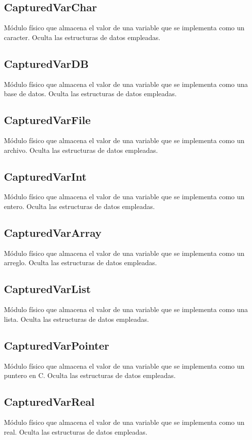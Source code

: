 \documentclass[a4paper,10pt]{report}
\begin{document}
			\subsection{CapturedVarChar}
			Módulo físico que almacena el valor de una variable que se implementa como un caracter. Oculta las estructuras de datos empleadas.
			\subsection{CapturedVarDB}
			Módulo físico que almacena el valor de una variable que se implementa como una base de datos. Oculta las estructuras de datos empleadas.
			\subsection{CapturedVarFile}
			Módulo físico que almacena el valor de una variable que se implementa como un archivo. Oculta las estructuras de datos empleadas.
			\subsection{CapturedVarInt}
			Módulo físico que almacena el valor de una variable que se implementa como un entero. Oculta las estructuras de datos empleadas.
			\subsection{CapturedVarArray}
			Módulo físico que almacena el valor de una variable que se implementa como un arreglo. Oculta las estructuras de datos empleadas.
			\subsection{CapturedVarList}
			Módulo físico que almacena el valor de una variable que se implementa como una lista. Oculta las estructuras de datos empleadas.
			\subsection{CapturedVarPointer}
			Módulo físico que almacena el valor de una variable que se implementa como un puntero en C. Oculta las estructuras de datos empleadas.
			\subsection{CapturedVarReal}
			Módulo físico que almacena el valor de una variable que se implementa como un real. Oculta las estructuras de datos empleadas.
\end{document}
